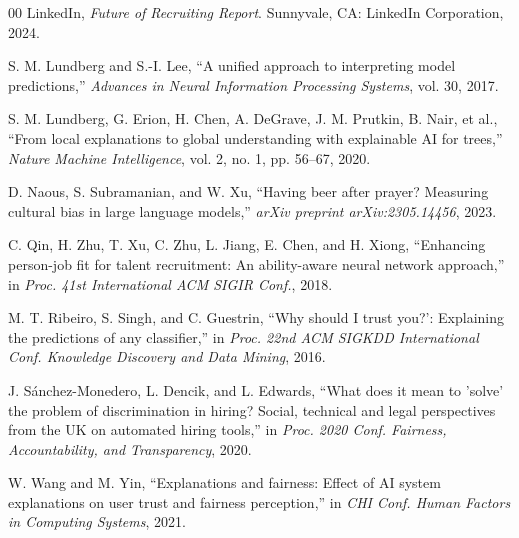 \documentclass[conference]{IEEEtran}
\begin{document}
\begin{thebibliography}{00}
 LinkedIn, \textit{Future of Recruiting Report}. Sunnyvale, CA: LinkedIn Corporation, 2024.

 S. M. Lundberg and S.-I. Lee, ``A unified approach to interpreting model predictions,'' \textit{Advances in Neural Information Processing Systems}, vol. 30, 2017.

 S. M. Lundberg, G. Erion, H. Chen, A. DeGrave, J. M. Prutkin, B. Nair, et al., ``From local explanations to global understanding with explainable AI for trees,'' \textit{Nature Machine Intelligence}, vol. 2, no. 1, pp. 56--67, 2020.

 D. Naous, S. Subramanian, and W. Xu, ``Having beer after prayer? Measuring cultural bias in large language models,'' \textit{arXiv preprint arXiv:2305.14456}, 2023.

 C. Qin, H. Zhu, T. Xu, C. Zhu, L. Jiang, E. Chen, and H. Xiong, ``Enhancing person-job fit for talent recruitment: An ability-aware neural network approach,'' in \textit{Proc. 41st International ACM SIGIR Conf.}, 2018.

 M. T. Ribeiro, S. Singh, and C. Guestrin, ``Why should I trust you?': Explaining the predictions of any classifier,'' in \textit{Proc. 22nd ACM SIGKDD International Conf. Knowledge Discovery and Data Mining}, 2016.

 J. S\'{a}nchez-Monedero, L. Dencik, and L. Edwards, ``What does it mean to 'solve' the problem of discrimination in hiring? Social, technical and legal perspectives from the UK on automated hiring tools,'' in \textit{Proc. 2020 Conf. Fairness, Accountability, and Transparency}, 2020.

 W. Wang and M. Yin, ``Explanations and fairness: Effect of AI system explanations on user trust and fairness perception,'' in \textit{CHI Conf. Human Factors in Computing Systems}, 2021.

\end{thebibliography}
\end{document}
